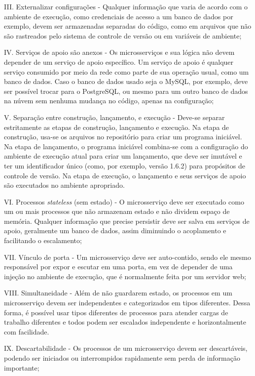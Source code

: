 III. Externalizar configurações - Qualquer informação que varia de acordo com o ambiente de execução, como credenciais de acesso a um banco de dados por exemplo, devem ser armazenadas separadas do código, como em arquivos que não são rastreados pelo sistema de controle de versão ou em variáveis de ambiente;

IV. Serviços de apoio são anexos - Os microsserviços e sua lógica não devem depender de um serviço de apoio específico. Um serviço de apoio é qualquer serviço consumido por meio da rede como parte de sua operação usual, como um banco de dados. Caso o banco de dados usado seja o MySQL, por exemplo, deve ser possível trocar para o PostgreSQL, ou mesmo para um outro banco de dados na núvem sem nenhuma mudança no código, apenas na configuração;

V. Separação entre construção, lançamento, e execução - Deve-se separar estritamente as etapas de construção, lançamento e execução. Na etapa de construção, usa-se os arquivos no repositório para criar um programa iniciável. Na etapa de lançamento, o programa iniciável combina-se com a configuração do ambiente de execução atual para criar um lançamento, que deve ser imutável e ter um identificador único (como, por exemplo, versão 1.6.2) para propósitos de controle de versão. Na etapa de execução, o lançamento e seus serviços de apoio são executados no ambiente apropriado.

VI. Processos \emph{stateless} (sem estado) - O microsserviço deve ser executado como um ou mais processos que não armazenam estado e não dividem espaço de memória. Qualquer informação que precise persistir deve ser salva em serviços de apoio, geralmente um banco de dados, assim diminuindo o acoplamento e facilitando o escalamento;

VII. Vínculo de porta - Um microsserviço deve ser auto-contido, sendo ele mesmo responsável por expor e escutar em uma porta, em vez de depender de uma injeção no ambiente de execução, que é normalmente feita por um servidor web;

VIII. Simultaneidade - Além de não guardarem estado, os processos em um microsserviço devem ser independentes e categorizados em tipos diferentes. Dessa forma, é possível usar tipos diferentes de processos para atender cargas de trabalho diferentes e todos podem ser escalados independente e horizontalmente com facilidade.

IX. Descartabilidade - Os processos de um microsserviço devem ser descartáveis, podendo ser iniciados ou interrompidos rapidamente sem perda de informação importante;

